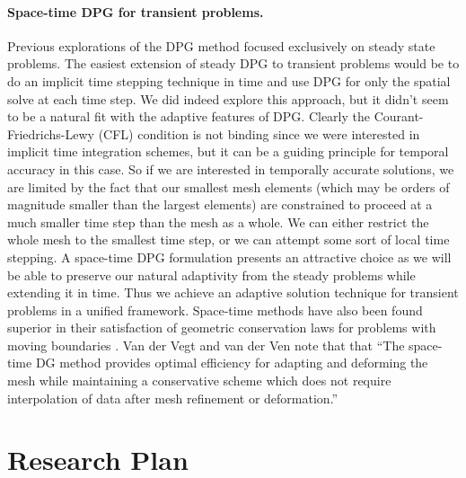 \documentclass[letterpaper]{article}
\begin{document}
\paragraph{Space-time DPG for transient problems.}
Previous explorations of the DPG method focused exclusively on steady state problems.
The easiest extension of steady DPG to transient problems would be to do an implicit time stepping technique in time 
and use DPG for only the spatial solve at each time step.
We did indeed explore this approach, but it didn't seem to be a natural fit with the adaptive features of DPG.
Clearly the Courant-Friedrichs-Lewy (CFL) condition is not binding since we were interested in implicit time integration schemes, 
but it can be a guiding principle for temporal accuracy in this case.
So if we are interested in temporally accurate solutions, we are limited by the fact that our smallest mesh elements 
(which may be orders of magnitude smaller than the largest elements) are constrained to proceed at a much smaller time step than the mesh as a whole. 
We can either restrict the whole mesh to the smallest time step, or we can attempt some sort of local time stepping.
A space-time DPG formulation presents an attractive choice as we will be able to preserve our natural adaptivity 
from the steady problems while extending it in time.
Thus we achieve an adaptive solution technique for transient problems in a unified framework.
Space-time methods have also been found superior in their satisfaction of geometric conservation laws for problems with moving boundaries \cite{GCL}.
Van der Vegt and van der Ven \cite{vanderVegtEuler} note that that ``The space-time DG method provides optimal efficiency for adapting and deforming the mesh while maintaining a conservative scheme which does not require interpolation of data after mesh refinement or deformation.''

\section*{Research Plan}
\end{document}
